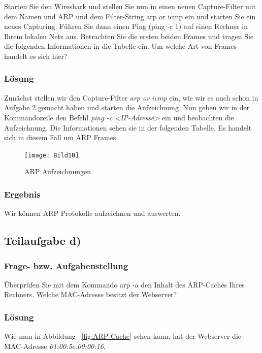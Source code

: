 Starten Sie den Wireshark und stellen Sie nun in einen neuen Capture-Filter mit dem Namen und ARP und dem Filter-String arp or icmp ein und starten Sie ein neues Capturing. Führen Sie dann einen Ping (ping -c 1) auf einen Rechner in Ihrem lokalen Netz aus. Betrachten Sie die ersten beiden Frames und tragen Sie die folgenden Informationen in die Tabelle ein. Um welche Art von Frames handelt es sich hier?

\subsubsection{Lösung}

Zunächst stellen wir den Capture-Filter \textit{arp or icmp} ein, wie wir es auch schon in Aufgabe 2 gemacht haben und starten die Aufzeichnung. Nun geben wir in der Kommandozeile den Befehl \textit{ping -c <IP-Adresse>} ein und beobachten die Aufzeichnung. Die Informationen sehen sie in der folgenden Tabelle. Es handelt sich in diesem Fall um ARP Frames.

\begin{figure}[htbp]
\begin{center}
\texttt{[image: Bild10]}
\caption{ARP Aufzeichnungen}
\end{center}
\end{figure}

\subsubsection{Ergebnis}

Wir können ARP Protokolle aufzeichnen und auswerten.

\subsection{Teilaufgabe d)}

\subsubsection{Frage- bzw. Aufgabenstellung}

Überprüfen Sie mit dem Kommando arp -a den Inhalt des ARP-Caches Ihres Rechners. Welche MAC-Adresse besitzt der Webserver?

\subsubsection{Lösung}

Wie man in Abbildung ~\ref{fig:ARP-Cache} sehen kann, hat der Webserver die MAC-Adresse \textit{01:00:5e:00:00:16}.


